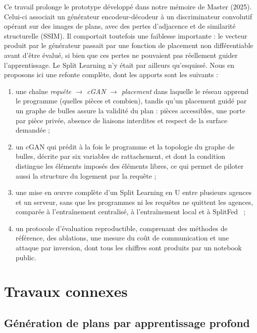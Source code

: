 \documentclass[twocolumn]{ICCKjournal}
\begin{document}
Ce travail prolonge le prototype développé dans notre mémoire de Master
(2025). Celui-ci associait un générateur encodeur-décodeur à un
discriminateur convolutif opérant sur des images de plans, avec des
pertes d'adjacence et de similarité structurelle (SSIM). Il comportait
toutefois une faiblesse importante : le vecteur produit par le
générateur passait par une fonction de placement non différentiable
avant d'être évalué, si bien que ces pertes ne pouvaient pas réellement
guider l'apprentissage. Le Split Learning n'y était par ailleurs
qu'esquissé. Nous en proposons ici une refonte complète, dont les
apports sont les suivants :
\begin{enumerate}
  \item une chaîne \emph{requête $\rightarrow$ cGAN $\rightarrow$
    placement} dans laquelle le réseau apprend le programme (quelles
    pièces et combien), tandis qu'un placement guidé par un graphe de
    bulles assure la validité du plan : pièces accessibles, une porte
    par pièce privée, absence de liaisons interdites et respect de la
    surface demandée ;
  \item un cGAN qui prédit à la fois le programme et la topologie du
    graphe de bulles, décrite par six variables de rattachement, et dont
    la condition distingue les éléments imposés des éléments libres, ce
    qui permet de piloter aussi la structure du logement par la requête ;
  \item une mise en œuvre complète d'un Split Learning en U entre
    plusieurs agences et un serveur, sans que les programmes ni les
    requêtes ne quittent les agences, comparée à l'entraînement
    centralisé, à l'entraînement local et à
    SplitFed~\cite{thapa2022splitfed} ;
  \item un protocole d'évaluation reproductible, comprenant des méthodes
    de référence, des ablations, une mesure du coût de communication et
    une attaque par inversion, dont tous les chiffres sont produits par
    un notebook public.
\end{enumerate}


\section{Travaux connexes}

\subsection{Génération de plans par apprentissage profond}
\end{document}
